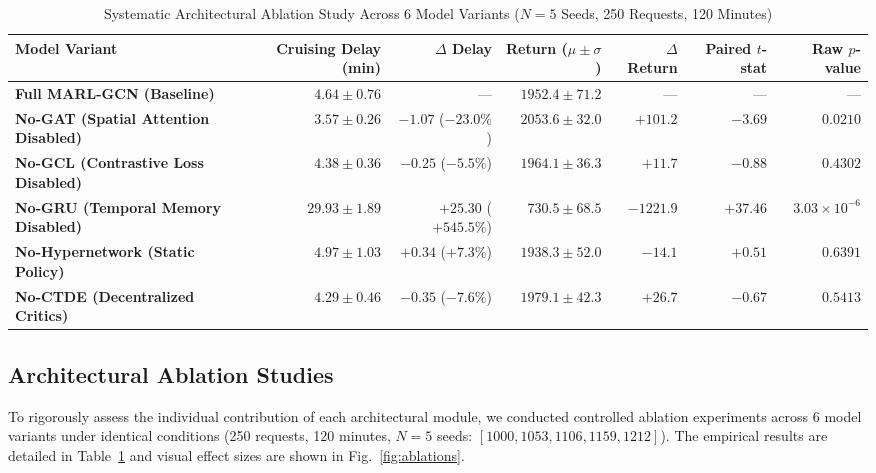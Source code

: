 \documentclass[journal]{IEEEtran}
\begin{document}
\begin{table}[t]
\caption{Systematic Architectural Ablation Study Across 6 Model Variants ($N=5$ Seeds, 250 Requests, 120 Minutes)}
\label{tab:ablations}
\centering
\begin{tabular}{lrrrrrr}
\toprule
\textbf{Model Variant} & \textbf{Cruising Delay (min)} & \textbf{$\Delta$ Delay} & \textbf{Return ($\mu \pm \sigma$)} & \textbf{$\Delta$ Return} & \textbf{Paired $t$-stat} & \textbf{Raw $p$-value} \\
\midrule
\textbf{Full MARL-GCN (Baseline)} & $4.64 \pm 0.76$ & --- & $1952.4 \pm 71.2$ & --- & --- & --- \\
\textbf{No-GAT (Spatial Attention Disabled)} & $3.57 \pm 0.26$ & $-1.07$ ($-23.0\%$) & $2053.6 \pm 32.0$ & $+101.2$ & $-3.69$ & $0.0210$ \\
\textbf{No-GCL (Contrastive Loss Disabled)} & $4.38 \pm 0.36$ & $-0.25$ ($-5.5\%$) & $1964.1 \pm 36.3$ & $+11.7$ & $-0.88$ & $0.4302$ \\
\textbf{No-GRU (Temporal Memory Disabled)} & $29.93 \pm 1.89$ & $+25.30$ ($+545.5\%$) & $730.5 \pm 68.5$ & $-1221.9$ & $+37.46$ & $3.03 \times 10^{-6}$ \\
\textbf{No-Hypernetwork (Static Policy)} & $4.97 \pm 1.03$ & $+0.34$ ($+7.3\%$) & $1938.3 \pm 52.0$ & $-14.1$ & $+0.51$ & $0.6391$ \\
\textbf{No-CTDE (Decentralized Critics)} & $4.29 \pm 0.46$ & $-0.35$ ($-7.6\%$) & $1979.1 \pm 42.3$ & $+26.7$ & $-0.67$ & $0.5413$ \\
\bottomrule
\end{tabular}
\end{table}

\subsection{Architectural Ablation Studies}
To rigorously assess the individual contribution of each architectural module, we conducted controlled ablation experiments across 6 model variants under identical conditions (250 requests, 120 minutes, $N=5$ seeds: $[1000, 1053, 1106, 1159, 1212]$). The empirical results are detailed in Table~\ref{tab:ablations} and visual effect sizes are shown in Fig.~\ref{fig:ablations}.
\end{document}

